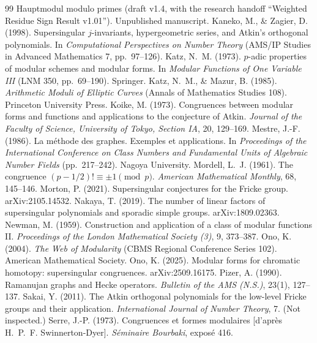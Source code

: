 \documentclass[11pt,a4paper]{article}
\numberwithin{equation}{section}
\theoremstyle{definition}
\theoremstyle{remark}
\begin{document}
\begin{thebibliography}{99}
{Hauptmodul modulo primes} (draft v1.4, with the research handoff ``Weighted Residue Sign Result v1.01'').
Unpublished manuscript.
 Kaneko, M., \& Zagier, D. (1998). Supersingular $j$-invariants,
hypergeometric series, and Atkin's orthogonal polynomials. In \emph{Computational Perspectives on Number
Theory} (AMS/IP Studies in Advanced Mathematics 7, pp.~97--126).
 Katz, N.~M. (1973). $p$-adic properties of modular schemes and modular forms.
In \emph{Modular Functions of One Variable III} (LNM 350, pp.~69--190). Springer.
 Katz, N.~M., \& Mazur, B. (1985). \emph{Arithmetic Moduli of Elliptic
Curves} (Annals of Mathematics Studies 108). Princeton University Press.
 Koike, M. (1973). Congruences between modular forms and functions and
applications to the conjecture of Atkin. \emph{Journal of the Faculty of Science, University of Tokyo, Section IA}, 20, 129--169.
 Mestre, J.-F. (1986). La m\'ethode des graphes. Exemples et applications.
In \emph{Proceedings of the International Conference on Class Numbers and Fundamental Units of Algebraic
Number Fields} (pp.~217--242). Nagoya University.
 Mordell, L.~J. (1961). The congruence $(p-1/2)!\equiv\pm1\pmod p$.
\emph{American Mathematical Monthly}, 68, 145--146.
 Morton, P. (2021). Supersingular conjectures for the Fricke group.
arXiv:2105.14532.
 Nakaya, T. (2019). The number of linear factors of supersingular
polynomials and sporadic simple groups. arXiv:1809.02363.
 Newman, M. (1959). Construction and application of a class of modular
functions II. \emph{Proceedings of the London Mathematical Society (3)}, 9, 373--387.
 Ono, K. (2004). \emph{The Web of Modularity} (CBMS Regional Conference Series 102).
American Mathematical Society.
 Ono, K. (2025). Modular forms for chromatic homotopy: supersingular congruences.
arXiv:2509.16175.
 Pizer, A. (1990). Ramanujan graphs and Hecke operators. \emph{Bulletin of the
AMS (N.S.)}, 23(1), 127--137.
 Sakai, Y. (2011). The Atkin orthogonal polynomials for the low-level Fricke
groups and their application. \emph{International Journal of Number Theory}, 7. (Not inspected.)
 Serre, J.-P. (1973). Congruences et formes modulaires [d'apr\`es
H.~P.~F. Swinnerton-Dyer]. \emph{S\'eminaire Bourbaki}, expos\'e 416.
\end{thebibliography}
\end{document}
